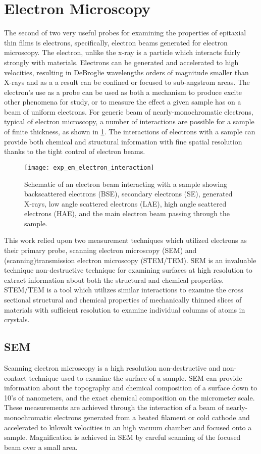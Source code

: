 \section{Electron Microscopy}
The second of two very useful probes for examining the properties of epitaxial thin films is electrons, specifically, electron beams generated for electron microscopy. The electron, unlike the x-ray is a particle which interacts fairly strongly with materials. Electrons can be generated and accelerated to high velocities, resulting in DeBroglie wavelengths orders of magnitude smaller than X-rays and as a a result can be confined or focused to sub-angstrom areas. The electron's use as a probe can be used as both a mechanism to produce excite other phenomena for study, or to measure the effect a given sample has on a beam of uniform electrons. For generic beam of nearly-monochromatic electrons, typical of electron microscopy, a number of interactions are possible for a sample of finite thickness, as shown in \cref{fig:exp_em_electron_interaction}. The interactions of electrons with a sample can provide both chemical and structural information with fine spatial resolution thanks to the tight control of electron beams.
\begin{figure}
    \centering
    \texttt{[image: exp\_em\_electron\_interaction]}
    \caption[Electron interactions with materials]{\label{fig:exp_em_electron_interaction}Schematic of an electron beam interacting with a sample showing backscattered electrons (BSE), secondary electrons (SE), generated X-rays, low angle scattered electrons (LAE), high angle scattered electrons (HAE), and the main electron beam passing through the sample.}
\end{figure}

This work relied upon two measurement techniques which utilized electrons as their primary probe, scanning electron microscopy (SEM) and (scanning)transmission electron microscopy (STEM/TEM). SEM is an invaluable technique non-destructive technique for examining surfaces at high resolution to extract information about both the structural and chemical properties. STEM/TEM is a tool which utilizes similar interactions to examine the cross sectional structural and chemical properties of mechanically thinned slices of materials with sufficient resolution to examine individual columns of atoms in crystals.
\subsection{SEM}
Scanning electron microscopy is a high resolution non-destructive and non-contact technique used to examine the surface of a sample. SEM can provide information about the topography and chemical composition of a surface down to 10's of nanometers, and the exact chemical composition on the micrometer scale. These measurements are achieved through the interaction of a beam of nearly-monochromatic electrons generated from a heated filament or cold cathode and accelerated to kilovolt velocities in an high vacuum chamber and focused onto a sample. Magnification is achieved in SEM by careful scanning of the focused beam over a small area.

